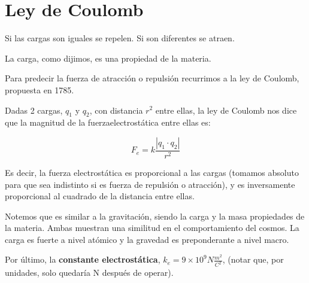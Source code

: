 \section{Ley de Coulomb}

Si las cargas son iguales se repelen.
Si son diferentes se atraen.

La carga,
como dijimos,
es una propiedad de la materia.

Para predecir la fuerza de atracción o repulsión recurrimos a la ley de Coulomb,
propuesta en 1785.

Dadas 2 cargas,
\(q_1\) y \(q_2\),
con distancia \(r^{2}\) entre ellas,
la ley de Coulomb nos dice que la magnitud de la fuerzaelectrostática entre ellas es:

\vspace{.3cm}
\begin{equation}
    F_e = k\frac{|q_1\cdot q_2|}{r^{2}}
\end{equation}
\vspace{.3cm}

Es decir,
la fuerza electrostática es proporcional a las cargas
(tomamos absoluto para que sea indistinto si es fuerza de repulsión o atracción),
y es inversamente proporcional al cuadrado de la distancia entre ellas.

Notemos que es similar a la gravitación,
siendo la carga y la masa propiedades de la materia.
Ambas muestran una similitud en el comportamiento del cosmos.
La carga es fuerte a nivel atómico y la gravedad es preponderante a nivel macro.

Por último,
la \textbf{constante electrostática},
\(k_e = 9 \times 10^{9} N \frac{m^{2}}{C^{2}}\),
(notar que, por unidades, solo quedaría N después de operar).

